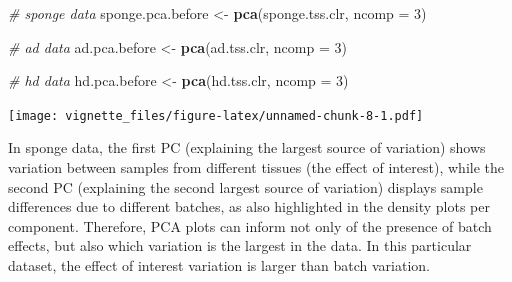 \documentclass[]{book}
\newenvironment{Shaded}{\begin{snugshade}}{\end{snugshade}}
\newcommand{\KeywordTok}[1]{\textcolor[rgb]{0.13,0.29,0.53}{\textbf{#1}}}
\newcommand{\DataTypeTok}[1]{\textcolor[rgb]{0.13,0.29,0.53}{#1}}
\newcommand{\DecValTok}[1]{\textcolor[rgb]{0.00,0.00,0.81}{#1}}
\newcommand{\FloatTok}[1]{\textcolor[rgb]{0.00,0.00,0.81}{#1}}
\newcommand{\StringTok}[1]{\textcolor[rgb]{0.31,0.60,0.02}{#1}}
\newcommand{\CommentTok}[1]{\textcolor[rgb]{0.56,0.35,0.01}{\textit{#1}}}
\newcommand{\OperatorTok}[1]{\textcolor[rgb]{0.81,0.36,0.00}{\textbf{#1}}}
\newcommand{\NormalTok}[1]{#1}
\begin{document}
\begin{Shaded}
\begin{Highlighting}[]
\CommentTok{# sponge data}
\NormalTok{sponge.pca.before <-}\StringTok{ }\KeywordTok{pca}\NormalTok{(sponge.tss.clr, }\DataTypeTok{ncomp =} \DecValTok{3}\NormalTok{)}

\CommentTok{# ad data}
\NormalTok{ad.pca.before <-}\StringTok{ }\KeywordTok{pca}\NormalTok{(ad.tss.clr, }\DataTypeTok{ncomp =} \DecValTok{3}\NormalTok{)}

\CommentTok{# hd data}
\NormalTok{hd.pca.before <-}\StringTok{ }\KeywordTok{pca}\NormalTok{(hd.tss.clr, }\DataTypeTok{ncomp =} \DecValTok{3}\NormalTok{)}
\end{Highlighting}
\end{Shaded}

\begin{Shaded}
\end{Shaded}

\texttt{[image: vignette\_files/figure-latex/unnamed-chunk-8-1.pdf]}

In sponge data, the first PC (explaining the largest source of
variation) shows variation between samples from different tissues (the
effect of interest), while the second PC (explaining the second largest
source of variation) displays sample differences due to different
batches, as also highlighted in the density plots per component.
Therefore, PCA plots can inform not only of the presence of batch
effects, but also which variation is the largest in the data. In this
particular dataset, the effect of interest variation is larger than
batch variation.
\end{document}
